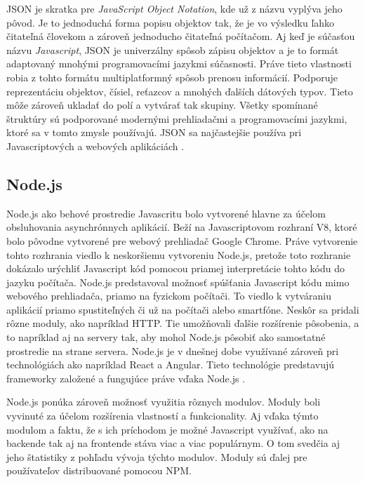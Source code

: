 JSON je skratka pre \textit{JavaScript Object Notation}, kde už z názvu vyplýva jeho pôvod. Je to jednoduchá forma popisu objektov tak, že je vo výsledku ľahko čitateľná človekom a zároveň jednoducho čitateľná počítačom. Aj keď je súčasťou názvu \textit{Javascript}, JSON je univerzálny spôsob zápisu objektov a je to formát adaptovaný mnohými programovacími jazykmi súčasnosti. Práve tieto vlastnosti robia z tohto formátu multiplatformný spôsob prenosu informácií. Podporuje reprezentáciu objektov, čísiel, reťazcov a mnohých ďalších dátových typov. Tieto môže zároveň ukladať do polí a vytvárať tak skupiny. Všetky spomínané štruktúry sú podporované modernými prehliadačmi a programovacími jazykmi, ktoré sa v tomto zmysle používajú. JSON sa najčastejšie používa pri Javascriptových a webových aplikáciách \cite{JSON}.

\subsection{Node.js}

Node.js ako behové prostredie Javascritu bolo vytvorené hlavne za účelom obsluhovania asynchrónnych aplikácií. Beží na Javascriptovom rozhraní V8, ktoré bolo pôvodne vytvorené pre webový prehliadač Google Chrome. Práve vytvorenie tohto rozhrania viedlo k neskoršiemu vytvoreniu Node.js, pretože toto rozhranie dokázalo urýchliť Javascript kód pomocou priamej interpretácie tohto kódu do jazyku počítača. Node.js predstavoval možnosť spúšťania Javascript kódu mimo webového prehliadača, priamo na fyzickom počítači. To viedlo k vytváraniu aplikácií priamo spustiteľných či už na počítači alebo smartfóne. Neskôr sa pridali rôzne moduly, ako napríklad HTTP. Tie umožňovali ďalšie rozšírenie pôsobenia, a to napríklad aj na servery tak, aby mohol Node.js pôsobiť ako samostatné prostredie na strane servera. Node.js je v dnešnej dobe využívané zároveň pri technológiách ako napríklad React a Angular. Tieto technológie predstavujú frameworky založené a fungujúce práve vďaka Node.js \cite{Node}.

\bigskip

Node.js ponúka zároveň možnosť využitia rôznych modulov. Moduly boli vyvinuté za účelom rozšírenia vlastností a funkcionality. Aj vďaka týmto modulom a faktu, že s ich príchodom je možné Javascript využívať, ako na backende tak aj na frontende stáva viac a viac populárnym. O tom svedčia aj jeho štatistiky z pohľadu vývoja týchto modulov. Moduly sú ďalej pre používateľov distribuované pomocou NPM.

